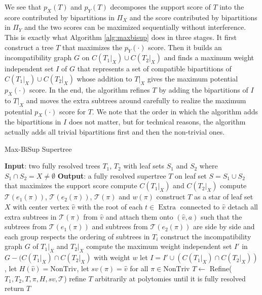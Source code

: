\documentclass{bmcart}
\newcommand{\triv}{\mathrm{Triv}}
\newcommand{\ntriv}{\mathrm{NonTriv}}
\DeclareMathOperator*{\extra}{Extra}
\theoremstyle{mystyle}
\theoremstyle{proofstyle}
\begin{document}
We see that $p_X(T)$ and $p_Y(T)$ decomposes the support score of $T$ into the score contributed by bipartitions in $\Pi_X$ and the score contributed by bipartitions in $\Pi_Y$ and the two scores can be maximized sequentially without interference. This is exactly what Algorithm \ref{alg:maxbisup} does in three stages. It first construct a tree $T$ that maximizes the $p_Y(\cdot)$ score. Then it builds an incompatibility graph $G$ on $C(T_1|_X) \cup C(T_2|_X)$ and finds a maximum weight independent set $I$ of $G$ that represents a set of compatible bipartitions of $C(T_1|_X) \cup C(T_2|_X)$ whose addition to $T|_X$ gives the maximum potential $p_X(\cdot)$ score. In the end, the algorithm refines $T$ by adding the bipartitions of $I$ to $T|_X$ and moves the extra subtrees around carefully to realize the maximum potential $p_X(\cdot)$ score for $T$. We note that the order in which the algorithm adds the bipartitions in $I$ does not matter, but for technical reasons, the algorithm actually adds all trivial bipartitions first and then the non-trivial ones.


\begin{algorithm}
    \caption{Max-BiSup Supertree}%
    \label{alg:maxbisup}
    \begin{algorithmic}[1]
        \Statex \textbf{Input}: two fully resolved trees $T_1$, $T_2$ with leaf sets $S_1$ and $S_2$ where $S_1 \cap S_2 = X \neq \emptyset$ 
        \Statex \textbf{Output}: a fully resolved supertree $T$ on leaf set $S = S_1 \cup S_2$ that maximizes the support score
        \State compute $C(T_1|_X)$ and $C(T_2|_X)$
            \State compute $\mathcal{T}(e_1(\pi))$, $\mathcal{T}(e_2(\pi))$, $\mathcal{T}(\pi)$ and $w(\pi)$
        \EndFor
        \State construct $T$ as a star of leaf set $X$ with center vertex $\hat{v}$ with the root of each $t \in \extra$ connected to $\hat{v}$         
        \For{each $\pi = \{a\}|B \in \triv$}
            \State detach all extra subtrees in $\mathcal{T}(\pi)$ from $\hat{v}$ and attach them onto $(\hat{v},a)$ such that the subtrees from $\mathcal{T}(e_1(\pi))$ and subtrees from $\mathcal{T}(e_2(\pi))$ are side by side and each group respects the ordering of subtrees in $T_i$ 
        \EndFor 
        \State construct the incompatibility graph $G$ of $T_1|_X$ and $T_2|_X$ 
        \State compute the maximum weight independent set $I'$ in $G - (C(T_1|_X) \cap C(T_2|_X)$ with weight $w$
        \State let $I = I' \cup (C(T_1|_X) \cap C(T_2|_X))$, let $H(\hat{v}) = \ntriv $, let $sv(\pi) = \hat{v}$ for all $\pi \in \ntriv$
        \For{each $\pi \in \ntriv \cap I$}
            \State $T \gets $ Refine($T_1,T_2, T, \pi, H, sv, \mathcal{T}$) 
        \EndFor
        \State refine $T$ arbitrarily at polytomies until it is fully resolved
        \State return $T$
    \end{algorithmic}
\end{algorithm}
\end{document}
